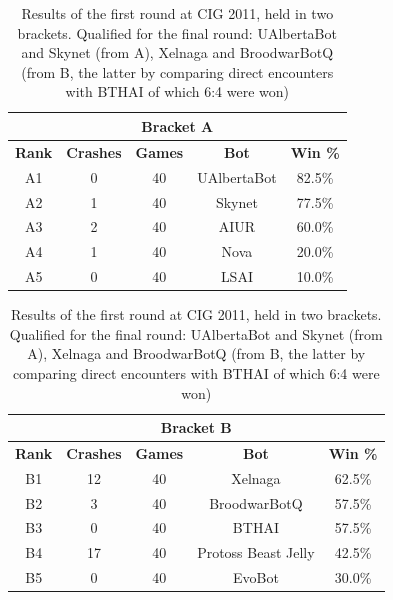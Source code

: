 \documentclass{llncs}
\begin{document}


\begin{table}[!t]
\caption{Results of the first round at CIG 2011, held in two brackets.
Qualified for the final round: UAlbertaBot and Skynet (from A), Xelnaga
and BroodwarBotQ (from B, the latter by comparing direct encounters
with BTHAI of which 6:4 were won)}
\label{tab:cig-first-round}
\centering
\begin{tabular}{|c|c|c|c|c|}
\hline
\multicolumn{5}{|c|}{Bracket A} \\ \hline
{\bfseries Rank} & {\bfseries Crashes} & {\bfseries Games} & {\bfseries Bot} & {\bfseries Win \%} \\
\hline
A1 & 0 &   40 &  UAlbertaBot & 82.5\% \\
A2 & 1 &     40 &  Skynet   &  77.5\% \\
A3 & 2 &   40 &  AIUR   &  60.0\% \\
A4 & 1 &   40 &  Nova   &  20.0\% \\
A5 & 0 &   40 &  LSAI   &  10.0\%\\
\hline
\end{tabular}
\begin{tabular}{|c|c|c|c|c|}
\hline
\multicolumn{5}{|c|}{Bracket B} \\ \hline
{\bfseries Rank} & {\bfseries Crashes} & {\bfseries Games} & {\bfseries Bot} & {\bfseries Win \%} \\
\hline
B1 & 12 &  40 &  Xelnaga &   62.5\%\\
B2 & 3 &   40 &  BroodwarBotQ  &  57.5\%\\
B3 & 0 &   40 &  BTHAI    &  57.5\%\\
B4 & 17 &  40 &  Protoss Beast Jelly  & 42.5\%\\
B5 & 0 &   40 &  EvoBot   &  30.0\%\\
\hline
\end{tabular}
\end{table}
\end{document}
